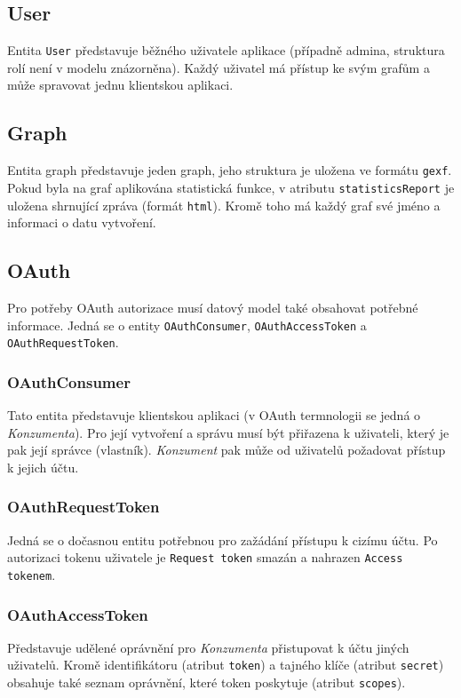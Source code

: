 \documentclass[thesis=M,czech]{FITthesis}[2014/05/6]
\begin{document}
\subsection{User}
Entita \texttt{User} představuje běžného uživatele aplikace (případně admina, struktura rolí není v modelu znázorněna). Každý
uživatel má přístup ke svým grafům a může spravovat jednu klientskou aplikaci.

\subsection{Graph}
Entita graph představuje jeden graph, jeho struktura je uložena ve formátu \texttt{gexf}. Pokud byla na graf aplikována statistická funkce,
v atributu \texttt{statistics\-Report} je uložena shrnující zpráva (formát \texttt{html}). Kromě toho má každý graf své jméno a informaci 
o datu vytvoření.

\subsection{OAuth}
Pro potřeby OAuth autorizace musí datový model také obsahovat potřebné informace. Jedná se o entity \texttt{OAuth\-Consumer}, \texttt{OAuth\-Access\-Token} a \texttt{OAuth\-Request\-Token}.

\subsubsection{OAuthConsumer}
Tato entita představuje klientskou aplikaci (v OAuth termnologii se jedná o \textit{Konzumenta}). Pro její vytvoření a správu musí být přiřazena k uživateli, který je pak její správce (vlastník).
\textit{Konzument} pak může od uživatelů požadovat přístup k jejich účtu.

\subsubsection{OAuthRequestToken}
Jedná se o dočasnou entitu potřebnou pro zažádání přístupu k cizímu účtu. Po autorizaci tokenu uživatele je \texttt{Request token} smazán a nahrazen \texttt{Access tokenem}.

\subsubsection{OAuthAccessToken}
Představuje udělené oprávnění pro \textit{Konzumenta} přistupovat k účtu jiných uživatelů. Kromě identifikátoru (atribut \texttt{token}) a tajného klíče (atribut \texttt{secret}) obsahuje také seznam
oprávnění, které token poskytuje (atribut \texttt{scopes}).
\end{document}
